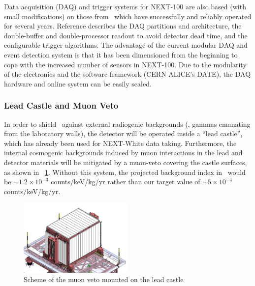 
Data acquisition (DAQ) and trigger systems for NEXT-100 are also based (with small modifications) on those from \NEW\, which have successfully and reliably operated for several years. Reference \cite{Esteve:2021a} describes the DAQ partitions and architecture, the double-buffer and double-processor readout to avoid detector dead time, and the configurable trigger algorithms. The advantage of the current modular DAQ and event detection system is that it has been dimensioned from the beginning to cope with the increased number of sensors in NEXT-100. Due to the modularity of the electronics and the software framework (CERN ALICE's DATE), the DAQ hardware and online system can be easily scaled.

\subsubsection{Lead Castle and Muon Veto}

In order to shield  \Next\ against external radiogenic backgrounds (\ie, gammas emanating from the laboratory walls), the detector will be operated inside a ``lead castle'', which has already been used for NEXT-White data taking. Furthermore, the internal cosmogenic backgrounds induced by muon interactions in the lead and detector materials will be mitigated by a muon-veto covering the castle surfaces, as shown in \fig\ \ref{fig.muonveto}.  Without this system, the projected background index in \Next\ would be $\sim1.2\times10^{-3}$ counts/keV/kg/yr rather than our target value of $\sim5\times10^{-4}$ counts/keV/kg/yr.   

\begin{figure}[htbp!]
\centering
\includegraphics[width=0.5\textwidth]{img2/MuonVeto_1.JPG}
\caption{\small Scheme of the muon veto mounted on the lead castle}
\label{fig.muonveto}
\end{figure}

